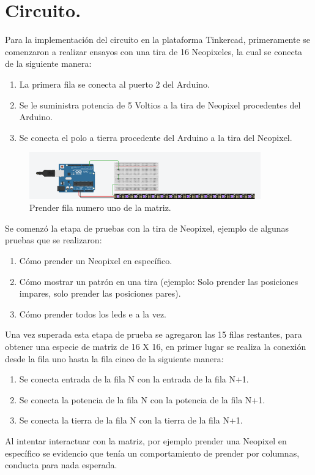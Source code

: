 \documentclass{article}
\begin{document}
\section{Circuito.} \label{circuito}
Para la implementación del circuito en la plataforma Tinkercad, primeramente se comenzaron a realizar ensayos con una tira de 16 Neopixeles, la cual se conecta de la siguiente manera:
\begin{enumerate}
  \item La primera fila se conecta al puerto 2 del Arduino.
  \item Se le suministra potencia de 5 Voltios a la tira de Neopixel procedentes del Arduino.
  \item Se conecta el polo a tierra procedente del Arduino a la tira del Neopixel.
\end{enumerate}
\begin{figure}[h]
  \includegraphics[width=10cm]{figura_1.png}
  \centering
  \caption{Prender fila numero uno de la matriz.}
  \label{fig:fila_uno}
\end{figure}
Se comenzó la etapa de pruebas con la tira de Neopixel, ejemplo de algunas pruebas que se realizaron:
\begin{enumerate}
    \item Cómo prender un Neopixel en específico.
    \item Cómo mostrar un patrón en una tira (ejemplo: Solo prender las posiciones impares, solo prender las posiciones pares).
    \item Cómo prender todos los leds e a la vez.
\end{enumerate}
Una vez superada esta etapa de prueba se agregaron las 15 filas restantes, para obtener una especie de matriz de 16 X 16, en primer lugar se realiza la conexión desde la fila uno hasta la fila cinco de la siguiente manera:
\begin{enumerate}
    \item Se conecta entrada de la fila N con la entrada de la fila N+1.
    \item Se conecta la potencia de la fila N con la potencia de la fila N+1.
    \item Se conecta la tierra de la fila N con la tierra de la fila N+1.
\end{enumerate}
Al intentar interactuar con la matriz, por ejemplo prender una Neopixel en específico se evidencio que tenía un comportamiento de prender por columnas, conducta para nada esperada.\\
\end{document}

